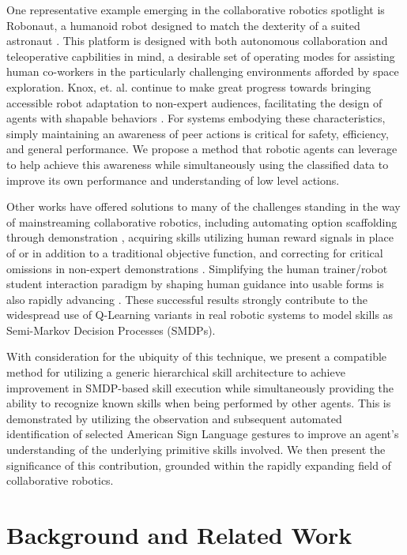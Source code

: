 \documentclass[letterpaper]{article}
\begin{document}
One representative example emerging in the collaborative robotics spotlight is Robonaut, a humanoid robot designed to match the dexterity of a suited astronaut \cite{Robonaut}. This platform is designed with both autonomous collaboration and teleoperative capbilities in mind,  a desirable set of operating modes for assisting human co-workers in the particularly challenging environments afforded by space exploration. Knox, et. al. continue to make great progress towards bringing accessible robot adaptation to non-expert audiences, facilitating the design of agents with shapable behaviors \cite{TAMER2}. For systems embodying these characteristics, simply maintaining an awareness of peer actions is critical for safety, efficiency, and general performance. We propose a method that robotic agents can leverage to help achieve this awareness while simultaneously using the classified data to improve its own performance and understanding of low level actions.

Other works have offered solutions to many of the challenges standing in the way of mainstreaming collaborative robotics, including automating option scaffolding through demonstration \cite{AutoSkillAcquisition}, acquiring skills utilizing human reward signals in place of \cite{TAMER} or in addition to \cite{TeacherRL} a traditional objective function, and correcting for critical omissions in non-expert demonstrations \cite{PerspectiveTaking}. Simplifying the human trainer/robot student interaction paradigm by shaping human guidance into usable forms is also rapidly advancing \cite{TAMER,Clicker,AdviceTaking,TeacherRL,DemonstrationRL}. These successful results strongly contribute to the widespread use of Q-Learning variants in real robotic systems to model skills as Semi-Markov Decision Processes (SMDPs).

With consideration for the ubiquity of this technique, we present a compatible method for utilizing a generic hierarchical skill architecture to achieve improvement in SMDP-based skill execution while simultaneously providing the ability to recognize known skills when being performed by other agents. This is demonstrated by utilizing the observation and subsequent automated identification of selected American Sign Language gestures to improve an agent's understanding of the underlying primitive skills involved. We then present the significance of this contribution, grounded within the rapidly expanding field of collaborative robotics.

\section{Background and Related Work}
\label{sec:background}
\end{document}
